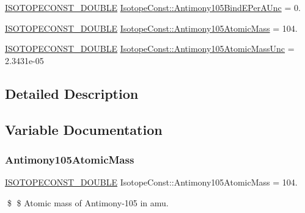 \begin{DoxyCompactItemize}
\mbox{\hyperlink{group___isotope_const-_macros_ga8f45a7272ce02c0b4c65c44636ed719a}{I\+S\+O\+T\+O\+P\+E\+C\+O\+N\+S\+T\+\_\+\+D\+O\+U\+B\+LE}} \mbox{\hyperlink{group___isotope_const-_antimony-_sb105_ga85b6bd821c5a6703209eb86f24490894}{Isotope\+Const\+::\+Antimony105\+Bind\+E\+Per\+A\+Unc}} = 0.
\item 
\mbox{\hyperlink{group___isotope_const-_macros_ga8f45a7272ce02c0b4c65c44636ed719a}{I\+S\+O\+T\+O\+P\+E\+C\+O\+N\+S\+T\+\_\+\+D\+O\+U\+B\+LE}} \mbox{\hyperlink{group___isotope_const-_antimony-_sb105_ga9e89d92b7dfbf432cac25843d6dd10d4}{Isotope\+Const\+::\+Antimony105\+Atomic\+Mass}} = 104.
\item 
\mbox{\hyperlink{group___isotope_const-_macros_ga8f45a7272ce02c0b4c65c44636ed719a}{I\+S\+O\+T\+O\+P\+E\+C\+O\+N\+S\+T\+\_\+\+D\+O\+U\+B\+LE}} \mbox{\hyperlink{group___isotope_const-_antimony-_sb105_ga2d1cd0a5b4cd02834d0b4f16d30eff54}{Isotope\+Const\+::\+Antimony105\+Atomic\+Mass\+Unc}} = 2.\+3431e-\/05
\end{DoxyCompactItemize}


\subsection{Detailed Description}


\subsection{Variable Documentation}
\mbox{\label{group___isotope_const-_antimony-_sb105_ga9e89d92b7dfbf432cac25843d6dd10d4}} 
\subsubsection{\texorpdfstring{Antimony105\+Atomic\+Mass}{Antimony105AtomicMass}}
{\footnotesize\ttfamily \mbox{\hyperlink{group___isotope_const-_macros_ga8f45a7272ce02c0b4c65c44636ed719a}{I\+S\+O\+T\+O\+P\+E\+C\+O\+N\+S\+T\+\_\+\+D\+O\+U\+B\+LE}} Isotope\+Const\+::\+Antimony105\+Atomic\+Mass = 104.}

\$ \$ Atomic mass of Antimony-\/105 in amu. \mbox{\label{group___isotope_const-_antimony-_sb105_ga2d1cd0a5b4cd02834d0b4f16d30eff54}} 

